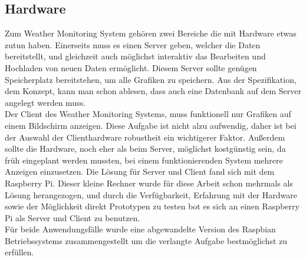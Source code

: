 \subsection{Hardware}
Zum Weather Monitoring System gehören zwei Bereiche die mit Hardware etwas zutun haben.
Einerseits muss es einen Server geben, welcher die Daten bereitstellt,
und gleichzeit auch möglichst interaktiv das Bearbeiten und Hochladen von neuen Daten ermöglicht.
Diesem Server sollte genügen Speicherplatz bereitstehen,
um alle Grafiken zu speichern.
Aus der Spezifikation, dem Konzept, kann man schon ablesen, dass auch eine Datenbank auf dem
Server angelegt werden muss.\\
Der Client des Weather Monitoring Systems, muss funktionell nur Grafiken auf einem Bildschirm anzeigen.
Diese Aufgabe ist nicht alzu aufwendig,
daher ist bei der Auswahl der Clienthardware robustheit ein wichtigerer Faktor.
Außerdem sollte die Hardware, noch eher als beim Server, möglichst kostgünstig sein,
da früh eingeplant werden mussten,
bei einem funktionierenden System mehrere Anzeigen einzusetzen.
Die Lösung für Server und Client fand sich mit dem Raspberry Pi.
Dieser kleine Rechner wurde für diese Arbeit schon mehrmals als Lösung herangezogen,
und durch die Verfügbarkeit,
Erfahrung mit der Hardware sowie der Möglichkeit direkt Prototypen
zu testen bot es sich an einen Raspberry Pi als Server und Client zu benutzen.\\
Für beide Anwendungsfälle wurde eine abgewandelte
Version des Raspbian Betriebssystems zusammengestellt
um die verlangte Aufgabe bestmöglichst zu erfüllen.


